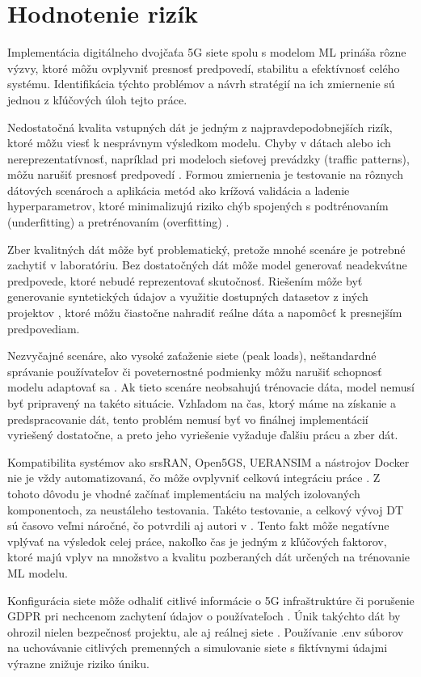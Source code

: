 \section{Hodnotenie rizík}
\par{
Implementácia digitálneho dvojčaťa 5G siete spolu s modelom ML prináša rôzne výzvy, ktoré môžu ovplyvniť presnosť predpovedí, stabilitu a efektívnosť celého systému. Identifikácia týchto problémov a návrh stratégií na ich zmiernenie sú jednou z kľúčových úloh tejto práce.

Nedostatočná kvalita vstupných dát je jedným z najpravdepodobnejších rizík, ktoré môžu viesť k nesprávnym výsledkom modelu. Chyby v dátach alebo ich nereprezentatívnosť, napríklad pri modeloch sieťovej prevádzky (traffic patterns), môžu narušiť presnosť predpovedí \cite{ML_traffic}. Formou zmiernenia je testovanie na rôznych dátových scenároch a aplikácia metód ako krížová validácia a ladenie hyperparametrov, ktoré minimalizujú riziko chýb spojených s podtrénovaním (underfitting) a pretrénovaním (overfitting) \cite{Nguyen}.

Zber kvalitných dát môže byť problematický, pretože mnohé scenáre je potrebné zachytiť v laboratóriu. Bez dostatočných dát môže model generovať neadekvátne predpovede, ktoré nebudé reprezentovať skutočnosť. Riešením môže byť generovanie syntetických údajov \cite{data_generating} a využitie dostupných datasetov z iných projektov \cite{datasets_telecom}, ktoré môžu čiastočne nahradiť reálne dáta a napomôcť k presnejším predpovediam.

Nezvyčajné scenáre, ako vysoké zaťaženie siete (peak loads), neštandardné správanie používateľov či poveternostné podmienky môžu narušiť schopnosť modelu adaptovať sa \cite{challenges_human_factor}. Ak tieto scenáre neobsahujú trénovacie dáta, model nemusí byť pripravený na takéto situácie. Vzhľadom na čas, ktorý máme na získanie a predspracovanie dát, tento problém nemusí byť vo finálnej implementácií vyriešený dostatočne, a preto jeho vyriešenie vyžaduje ďalšiu prácu a zber dát.

Kompatibilita systémov ako srsRAN, Open5GS, UERANSIM a nástrojov Docker nie je vždy automatizovaná, čo môže ovplyvniť celkovú integráciu práce \cite{challenges_human_factor}. Z tohoto dôvodu je vhodné začínať implementáciu na malých izolovaných komponentoch, za neustáleho testovania. Takéto testovanie, a celkový vývoj DT sú časovo veľmi náročné, čo potvrdili aj autori v \cite{USAirForce}. Tento fakt môže negatívne vplývať na výsledok celej práce, nakoľko čas je jedným z kľúčových faktorov, ktoré majú vplyv na množstvo a kvalitu pozberaných dát určených na trénovanie ML modelu.

Konfigurácia siete môže odhaliť citlivé informácie o 5G infraštruktúre či porušenie GDPR \cite{big-data-problems} pri nechcenom zachytení údajov o používateľoch \cite{challenges-technol}. Únik takýchto dát by ohrozil nielen bezpečnosť projektu, ale aj reálnej siete \cite{Dt_Iot_data_worry_about}. Používanie .env súborov na uchovávanie citlivých premenných a simulovanie siete s fiktívnymi údajmi výrazne znižuje riziko úniku.
}

